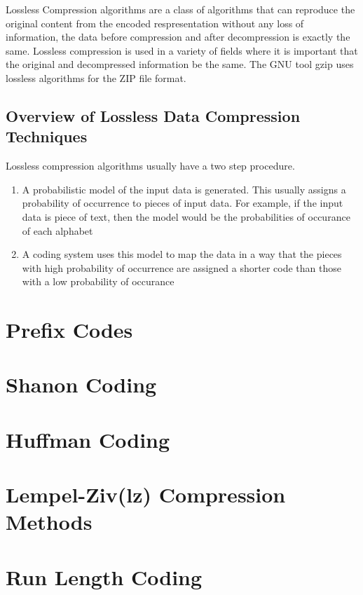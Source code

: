 \documentclass{article}
\begin{document}
Lossless Compression algorithms are a class of algorithms that can reproduce the original content from the encoded respresentation without any loss of information, the data before compression and after decompression is exactly the same. Lossless compression is used in a variety of fields where it is important that the original and decompressed information be the same. The GNU tool gzip uses lossless algorithms for the ZIP file format.

\subsection{Overview of Lossless Data Compression Techniques}

Lossless compression algorithms usually have a two step procedure. 
\begin{enumerate}
	\item A probabilistic model of the input data is generated. This usually assigns a probability of occurrence to pieces of input data. For example, if the input data is piece of text, then the model would be the probabilities of occurance of each alphabet
	
	\item A coding system uses this model to map the data in a way that the pieces with high probability of occurrence are assigned a shorter code than those with a low probability of occurance
\end{enumerate}

\section{Prefix Codes}
	
\section {Shanon Coding}

\section {Huffman Coding}

\section{Lempel-Ziv(lz) Compression Methods}

\section{Run Length Coding}
\end{document}
